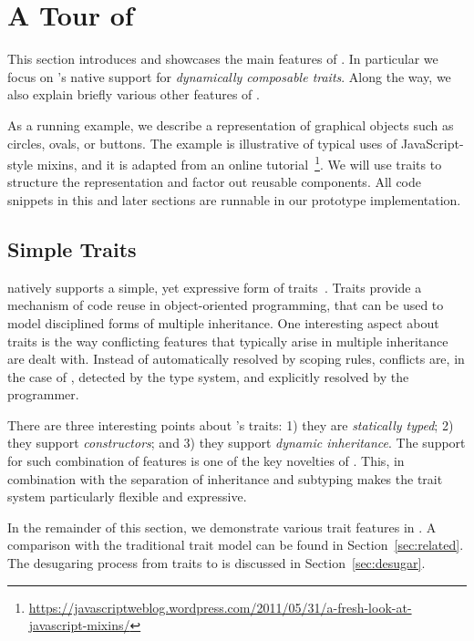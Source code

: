 
\section{A Tour of \name}
\label{sec:traits}

 

This section introduces and showcases the main features of \name. In particular
we focus on \name's native support for \textit{dynamically composable traits}.
Along the way, we also explain briefly various other features of \name.

As a running example, we describe a representation of graphical objects such as
circles, ovals, or buttons. The example is illustrative of typical uses of
JavaScript-style mixins, and it is adapted from an online
tutorial~\footnote{\url{https://javascriptweblog.wordpress.com/2011/05/31/a-fresh-look-at-javascript-mixins/}}.
We will use traits to structure the representation and factor out reusable
components. All code snippets in this and later sections are runnable in our
prototype implementation.


\subsection{Simple Traits}

\name natively supports a simple, yet expressive form of
traits~\cite{scharli2003traits}. Traits provide a mechanism of code reuse in
object-oriented programming, that can be used to model disciplined forms of
multiple inheritance. One interesting aspect about traits is the way conflicting
features that typically arise in multiple inheritance are dealt with. Instead of
automatically resolved by scoping rules, conflicts are, in the case of \name,
detected by the type system, and explicitly resolved by the programmer.

There are three interesting points about \name's traits: 1) they are
\emph{statically typed}; 2) they support \emph{constructors}; and 3)
they support \emph{dynamic inheritance}. The support for such
combination of features is one of the key novelties of \name. This, in
combination with the separation of inheritance and subtyping makes the
trait system particularly flexible and expressive.

In the remainder of this section, we demonstrate various trait features in
\name. A comparison with the traditional trait model can be found in
Section~\ref{sec:related}. The desugaring process from traits to \bname is
discussed in Section~\ref{sec:desugar}.

